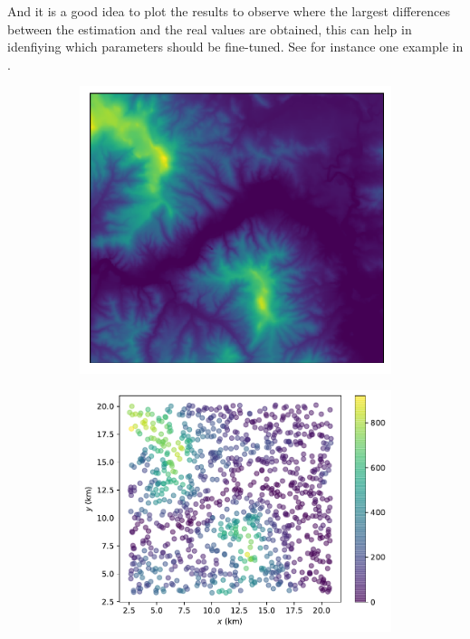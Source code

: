 And it is a good idea to plot the results to observe where the largest differences between the estimation and the real values are obtained, this can help in idenfiying which parameters should be fine-tuned.
See for instance one example in .
\begin{figure}
  \centering
  \begin{subfigure}[b]{0.40\linewidth}
    \centering
    \includegraphics[width=\textwidth]{figs/jackknife/jk1.pdf}
    \caption{}
  \end{subfigure}
  \quad
  \begin{subfigure}[b]{0.475\linewidth}
    \centering
    \includegraphics[width=\textwidth]{figs/jackknife/jk2.pdf}

\end{subfigure}
\end{figure}
